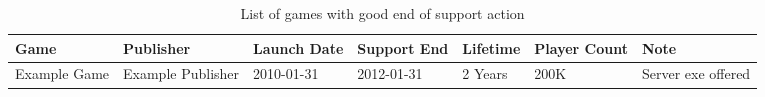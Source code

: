 \begin{landscape}
    \begin{table}[htbp]
        \centering
        \caption{List of games with good end of support action}%
        \label{tab:savedgames}
        \begin{tabular*}{1\textwidth}{lllllll}
            Game & Publisher & Launch Date & Support End & Lifetime & Player Count & Note \\ \toprule
            Example Game & Example Publisher & 2010-01-31 & 2012-01-31 & 2 Years & 200K & Server exe offered \\
        \end{tabular*}
    \end{table}
\end{landscape}
